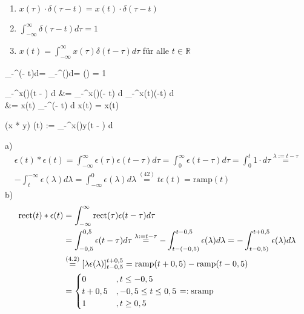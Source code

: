 \begin{tbox}
	\begin{enumerate}[label=\Roman*)]
		\item $x(\tau) \cdot \delta(\tau - t) = x(t) \cdot \delta(\tau - t)$
		\item $\int_{-\infty}^{\infty}\delta(\tau - t)d\tau = 1$
		\item $x(t) = \int_{-\infty}^{\infty}x(\tau)\delta(t-\tau)d\tau$ für alle $ t \in \mathbb{R}$
	\end{enumerate}
\end{tbox}

\begin{abox}
	\int_{-\infty}^{\infty}\delta(\tau - t)d\tau = \int_{-\infty}^{\infty}\delta(\lambda)d\lambda = \epsilon(\infty) = 1
\end{abox}


\begin{abox}
	\int_{-\infty}^{\infty}x(\tau)\delta(t  - \tau) d \tau &= 	\int_{-\infty}^{\infty}x(\tau)\delta(\tau - t) d \tau {}	\int_{-\infty}^{\infty}x(t)\delta(\tau -t) d \tau \\
	&= x(t)	\int_{-\infty}^{\infty}\delta(\tau - t) d \tau {} x(t)  = x(t)
\end{abox}

\begin{abox}
	(x * y) (t) := 	\int_{-\infty}^{\infty}x(\tau)y(t  - \tau) d \tau
\end{abox}

\begin{tbox}
	a) \begin{align*}\epsilon(t) * \epsilon(t) = \int_{-\infty}^{\infty}\epsilon(\tau)\epsilon(t  - \tau) d \tau = 
	\int_{0}^{\infty}\epsilon(t  - \tau) d \tau = 	\int_{0}^{t}1 \cdot d\tau \overset{\lambda := t-\tau}{=}\\
	-\int_{t}^{-\infty}\epsilon(\lambda) d \lambda = 
	\int_{-\infty}^{0}\epsilon(\lambda) d \lambda \overset{(42)}{=} t\epsilon(t) = \text{ramp}(t)\end{align*}
	b) \begin{align*}
	\text{rect}(t) * \epsilon(t) &= 	\int_{-\infty}^{\infty}\text{rect}(\tau)\epsilon(t  - \tau) d \tau \\&= 
	\int_{-0,5}^{0,5}\epsilon(t  - \tau) d \tau \overset{\lambda := t-\tau}{=}
	-\int_{t-(-0,5)}^{t-0,5}\epsilon(\lambda) d \lambda = 
	-\int_{t-0,5)}^{t+0,5}\epsilon(\lambda) d \lambda\\ &\overset{(4.2)}{=}[\lambda\epsilon(\lambda)]_{t-0,5}^{t+0,5}
	= \text{ramp}(t+0,5) - \text{ramp}(t-0,5)\\
	&= \begin{cases}
	0 &, t \leq -0,5\\
	t+0,5 &, -0,5 \leq t \leq 0,5\\
	1 &, t \geq 0,5
	\end{cases} =: \text{sramp}
	\end{align*}
\end{tbox}

